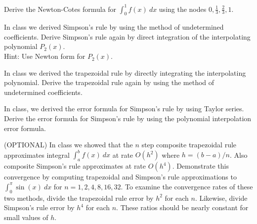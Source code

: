 \documentclass[addpoints, 11pt]{exam}
\newcommand{\ds}{\displaystyle}
\begin{document}
\begin{questions}
\question Derive the Newton-Cotes formula for $\ds \int_0^1 f(x)~dx$ using the nodes $0, \frac{1}{3}, \frac{2}{3}, 1$. 

\question In class we derived Simpson's rule by using the method of undetermined coefficients. Derive Simpson's rule again by direct integration of the interpolating polynomial $P_2(x)$. \\ Hint: Use Newton form for $P_2(x)$. 

\question In class we derived the trapezoidal rule by directly integrating the interpolating polynomial. Derive the trapezoidal rule again by using the method of undetermined coefficients. 

\question In class, we derived the error formula for Simpson's rule by using Taylor series. Derive the error formula for Simpson's rule by using the polynomial interpolation error formula. 

\question
{}

\question (OPTIONAL) In class we showed that the $n$ step composite trapezoidal rule approximates integral $\ds \int_a^b f(x)~dx $ at rate $O(h^2)$ where $h=(b-a)/n$. Also composite Simpson's rule approximates at rate $O(h^4)$. Demonstrate this convergence by computing trapezoidal and Simpson's rule approximations to $\ds \int_0^{\pi} \sin(x)~dx$ for $n=1, 2, 4, 8, 16, 32$. To examine the convergence rates of these two methods, divide the trapezoidal rule error by $h^2$ for each $n$. Likewise, divide Simpson's rule error by $h^4$ for each $n$. These ratios should be nearly constant for small values of $h$.

\end{questions}
\end{document}
